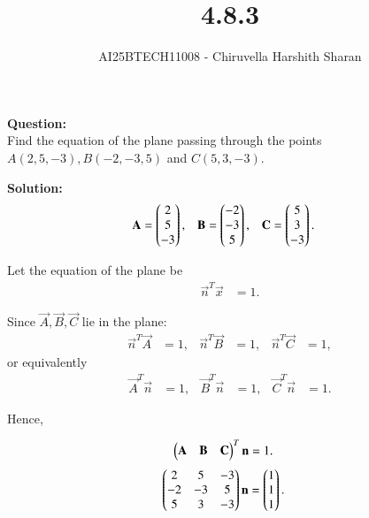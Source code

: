 \documentclass[journal]{IEEEtran}
\begin{document}
\title{4.8.3}
\author{AI25BTECH11008 - Chiruvella Harshith Sharan}
\maketitle
\renewcommand{\thefigure}{\theenumi}
\renewcommand{\thetable}{\theenumi}

\noindent
\textbf{Question:}\\
\vspace{0.5cm}
Find the equation of the plane passing through the points 
$A(2, 5, -3), B(-2, -3, 5)$ and $C(5, 3, -3)$.
\vspace{0.4cm}

\noindent
\textbf{Solution:}\\

\begin{align}
\mathbf{A} &= \begin{pmatrix}2 \\ 5 \\ -3\end{pmatrix}, & 
\mathbf{B} &= \begin{pmatrix}-2 \\ -3 \\ 5\end{pmatrix}, & 
\mathbf{C} &= \begin{pmatrix}5 \\ 3 \\ -3\end{pmatrix}.
\end{align}

Let the equation of the plane be
\begin{align}
\vec{n}^T \vec{x} &= 1.
\end{align}

Since $\vec{A}, \vec{B}, \vec{C}$ lie in the plane:
\begin{align}
\vec{n}^T \vec{A} &= 1, & 
\vec{n}^T \vec{B} &= 1, & 
\vec{n}^T \vec{C} &= 1,
\end{align}
or equivalently
\begin{align}
\vec{A}^T \vec{n} &= 1, & 
\vec{B}^T \vec{n} &= 1, & 
\vec{C}^T \vec{n} &= 1.
\end{align}

Hence,


\begin{align}
\begin{pmatrix}\mathbf{A} & \mathbf{B} & \mathbf{C}\end{pmatrix}^{T} \mathbf{n} 
&= 1.
\end{align}
\begin{align}
\begin{pmatrix} 2 & 5 & -3 \\ -2 & -3 & 5 \\ 5 & 3 & -3\end{pmatrix}\mathbf{n}
&= \begin{pmatrix}1 \\ 1 \\ 1\end{pmatrix}.
\end{align}
\end{document}
